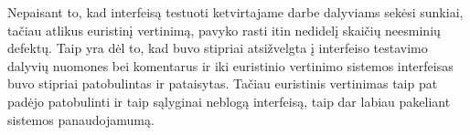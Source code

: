 Nepaisant to, kad interfeisą testuoti ketvirtajame darbe dalyviams sekėsi sunkiai,
tačiau atlikus euristinį vertinimą, pavyko rasti itin nedidelį skaičių neesminių defektų.
Taip yra dėl to, kad buvo stipriai atsižvelgta į interfeiso testavimo dalyvių nuomones
bei komentarus ir iki euristinio vertinimo sistemos interfeisas buvo 
stipriai patobulintas ir pataisytas. Tačiau euristinis vertinimas taip pat padėjo
patobulinti ir taip sąlyginai neblogą interfeisą, taip dar labiau pakeliant sistemos
panaudojamumą. 
